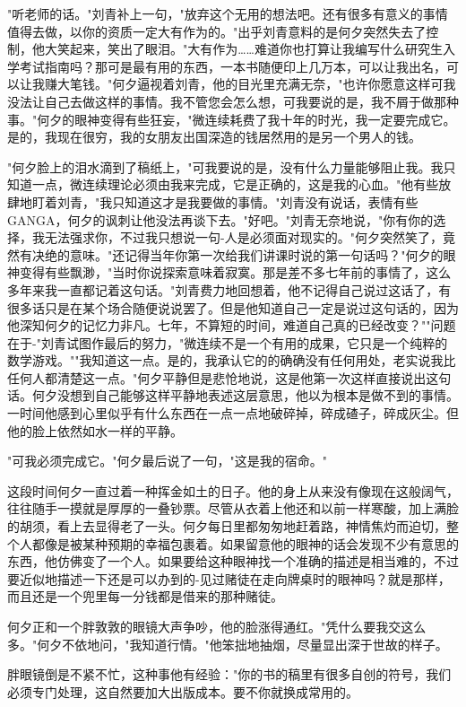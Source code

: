 \documentclass[UTF8]{ctexart}
\begin{document}
"听老师的话。"刘青补上一句，"放弃这个无用的想法吧。还有很多有意义的事情值得去做，以你的资质一定大有作为的。"出乎刘青意料的是何夕突然失去了控制，他大笑起来，笑出了眼泪。"大有作为……难道你也打算让我编写什么研究生入学考试指南吗？那可是最有用的东西，一本书随便印上几万本，可以让我出名，可以让我赚大笔钱。"何夕逼视着刘青，他的目光里充满无奈，"也许你愿意这样可我没法让自己去做这样的事情。我不管您会怎么想，可我要说的是，我不屑于做那种事。"何夕的眼神变得有些狂妄，"微连续耗费了我十年的时光，我一定要完成它。是的，我现在很穷，我的女朋友出国深造的钱居然用的是另一个男人的钱。

"何夕脸上的泪水滴到了稿纸上，"可我要说的是，没有什么力量能够阻止我。我只知道一点，微连续理论必须由我来完成，它是正确的，这是我的心血。"他有些放肆地盯着刘青，"我只知道这才是我要做的事情。"刘青没有说话，表情有些GANGA，何夕的讽刺让他没法再谈下去。"好吧。"刘青无奈地说，"你有你的选择，我无法强求你，不过我只想说一句-人是必须面对现实的。"何夕突然笑了，竟然有决绝的意味。"还记得当年你第一次给我们讲课时说的第一句话吗？"何夕的眼神变得有些飘渺，"当时你说探索意味着寂寞。那是差不多七年前的事情了，这么多年来我一直都记着这句话。"刘青费力地回想着，他不记得自己说过这话了，有很多话只是在某个场合随便说说罢了。但是他知道自己一定是说过这句话的，因为他深知何夕的记忆力非凡。七年，不算短的时间，难道自己真的已经改变？""问题在于-"刘青试图作最后的努力，"微连续不是一个有用的成果，它只是一个纯粹的数学游戏。""我知道这一点。是的，我承认它的的确确没有任何用处，老实说我比任何人都清楚这一点。"何夕平静但是悲怆地说，这是他第一次这样直接说出这句话。何夕没想到自己能够这样平静地表述这层意思，他以为根本是做不到的事情。一时间他感到心里似乎有什么东西在一点一点地破碎掉，碎成碴子，碎成灰尘。但他的脸上依然如水一样的平静。

"可我必须完成它。"何夕最后说了一句，"这是我的宿命。"

这段时间何夕一直过着一种挥金如土的日子。他的身上从来没有像现在这般阔气，往往随手一摸就是厚厚的一叠钞票。尽管从衣着上他还和以前一样寒酸，加上满脸的胡须，看上去显得老了一头。何夕每日里都匆匆地赶着路，神情焦灼而迫切，整个人都像是被某种预期的幸福包裹着。如果留意他的眼神的话会发现不少有意思的东西，他仿佛变了一个人。如果要给这种眼神找一个准确的描述是相当难的，不过要近似地描述一下还是可以办到的-见过赌徒在走向牌桌时的眼神吗？就是那样，而且还是一个兜里每一分钱都是借来的那种赌徒。

何夕正和一个胖敦敦的眼镜大声争吵，他的脸涨得通红。"凭什么要我交这么多。"何夕不依地问，"我知道行情。"他笨拙地抽烟，尽量显出深于世故的样子。

胖眼镜倒是不紧不忙，这种事他有经验："你的书的稿里有很多自创的符号，我们必须专门处理，这自然要加大出版成本。要不你就换成常用的。
\end{document}
